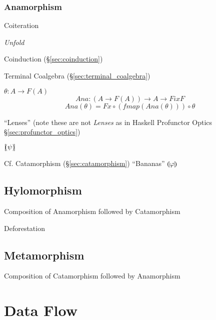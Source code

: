 \subsubsection{Anamorphism}\label{sec:anamorphism}

Coiteration

\emph{Unfold}

Coinduction (\S\ref{sec:coinduction})

Terminal Coalgebra (\S\ref{sec:terminal_coalgebra})

$\theta : A \rightarrow F(A)$
\[
  Ana : (A \rightarrow F (A)) \rightarrow A \rightarrow Fix F
\]\[
  Ana (\theta) = Fx \circ (fmap (Ana (\theta))) \circ \theta
\]

``Lenses'' (note these are not \emph{Lenses} as in Haskell \fist Profunctor
Optics \S\ref{sec:profunctor_optics})

$[\kern-1.95pt( \psi )\kern-2.0pt]$

\fist Cf. Catamorphism (\S\ref{sec:catamorphism}) ``Bananas''
$\llparenthesis \varphi \rrparenthesis$



\subsection{Hylomorphism}\label{sec:hylomorphism}

Composition of Anamorphism followed by Catamorphism

Deforestation



\subsection{Metamorphism}\label{sec:metamorphism}

Composition of Catamorphism followed by Anamorphism



\section{Data Flow}\label{sec:data_flow}

